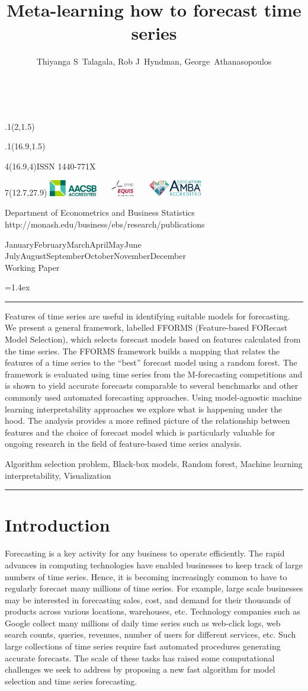 \documentclass[11pt,a4paper,]{article}
\title{Meta-learning how to forecast time series}
\author{Thiyanga S~Talagala, Rob J~Hyndman, George~Athanasopoulos}
\date{\sf\Date~\Month~\Year}
\makeatletter
\def\Date{\number\day}
\def\Month{\ifcase\month\or
 January\or February\or March\or April\or May\or June\or
 July\or August\or September\or October\or November\or December\fi}
\def\Year{\number\year}
\def\showjel{{\large\textsf{\textbf{JEL classification:}}~\@jel}}
\def\cover{{\sffamily\setcounter{page}{0}
        \thispagestyle{empty}
        \placefig{2}{1.5}{width=5cm}{monash2}
        \placefig{16.9}{1.5}{width=2.1cm}{MBusSchool}
        \begin{textblock}{4}(16.9,4)ISSN 1440-771X\end{textblock}
        \begin{textblock}{7}(12.7,27.9)\hfill
        \includegraphics[height=0.7cm]{AACSB}~~~
        \includegraphics[height=0.7cm]{EQUIS}~~~
        \includegraphics[height=0.7cm]{AMBA}
        \end{textblock}
        \vspace*{2cm}
        \begin{center}\Large
        Department of Econometrics and Business Statistics\\[.5cm]
        \footnotesize http://monash.edu/business/ebs/research/publications
        \end{center}\vspace{2cm}
        \begin{center}
        \fbox{\parbox{14cm}{\begin{onehalfspace}\centering\Huge\vspace*{0.3cm}
                \textsf{\textbf{\expandafter{\@title}}}\vspace{1cm}\par
                \LARGE\@author\end{onehalfspace}
        }}
        \end{center}
        \vfill
                \begin{center}\Large
                \Month~\Year\\[1cm]
                Working Paper \@wp
        \end{center}\vspace*{2cm}}}
\def\pageone{{\sffamily\setstretch{1}%
        \thispagestyle{empty}%
        \vbox to \textheight{%
        \raggedright\baselineskip=1.2cm
     {\fontsize{24.88}{30}\sffamily\textbf{\expandafter{\@title}}}
        \vspace{2cm}\par
        \hspace{1cm}\parbox{14cm}{\sffamily\large\@addresses}\vspace{1cm}\vfill
        \hspace{1cm}{\large\Date~\Month~\Year}\\[1cm]
        \hspace{1cm}\showjel\vss}}}
\def\blindtitle{{\sffamily
     \thispagestyle{plain}\raggedright\baselineskip=1.2cm
     {\fontsize{24.88}{30}\sffamily\textbf{\expandafter{\@title}}}\vspace{1cm}\par
        }}
\def\titlepage{{\cover\newpage\pageone\newpage\blindtitle}}
\let\maketitle\titlepage
\newenvironment{keywords}{\par\vspace{0.5cm}\noindent{\sffamily\textbf{Keywords:}}}{\vspace{0.25cm}\par\hrule\vspace{0.5cm}\par}
\renewenvironment{abstract}{\begin{minipage}{\textwidth}\parskip=1.4ex\noindent
\hrule\vspace{0.1cm}\par{\sffamily\textbf{\abstractname}}\newline}
  {\end{minipage}}
\def\placefig#1#2#3#4{\begin{textblock}{.1}(#1,#2)\rlap{\texttt{[image: \#4]}}\end{textblock}}
\makeatother
\begin{document}
\maketitle
\begin{abstract}
Features of time series are useful in identifying suitable models for forecasting. We present a general framework, labelled FFORMS (Feature-based FORecast Model Selection), which selects forecast models based on features calculated from the time series. The FFORMS framework builds a mapping that relates the features of a time series to the ``best'' forecast model using a random forest. The framework is evaluated using time series from the M-forecasting competitions and is shown to yield accurate forecasts comparable to several benchmarks and other commonly used automated forecasting approaches. Using model-agnostic machine learning interpretability approaches we explore what is happening under the hood. The analysis provides a more refined picture of the relationship between features and the choice of forecast model which is particularly valuable for ongoing research in the field of feature-based time series analysis.
\end{abstract}
\begin{keywords}
Algorithm selection problem, Black-box models, Random forest, Machine learning interpretability, Visualization
\end{keywords}

\hypertarget{introduction}{%
\section{Introduction}\label{introduction}}

Forecasting is a key activity for any business to operate efficiently. The rapid advances in computing technologies have enabled businesses to keep track of large numbers of time series. Hence, it is becoming increasingly common to have to regularly forecast many millions of time series. For example, large scale businesses may be interested in forecasting sales, cost, and demand for their thousands of products across various locations, warehouses, etc. Technology companies such as Google collect many millions of daily time series such as web-click logs, web search counts, queries, revenues, number of users for different services, etc. Such large collections of time series require fast automated procedures generating accurate forecasts. The scale of these tasks has raised some computational challenges we seek to address by proposing a new fast algorithm for model selection and time series forecasting.
\end{document}
